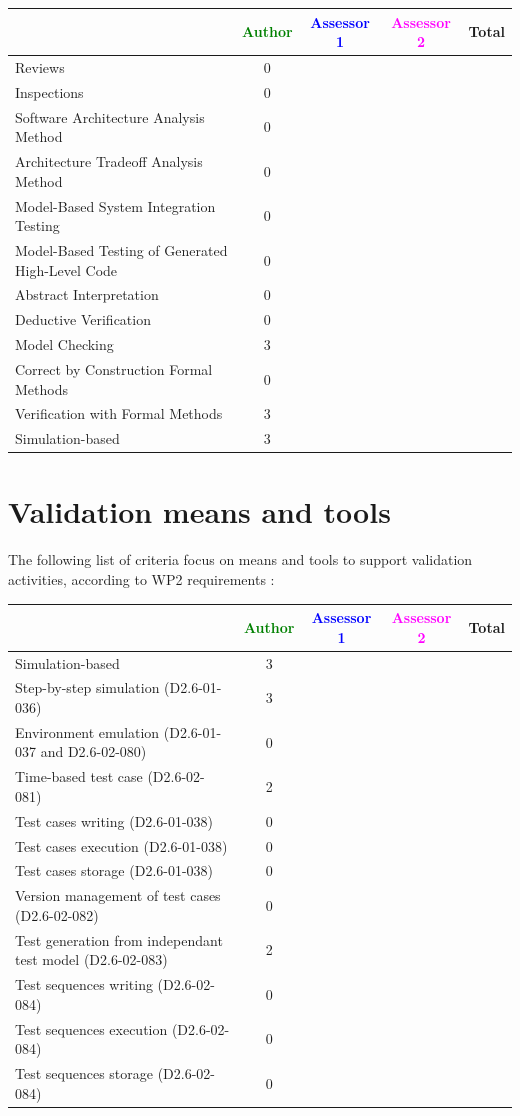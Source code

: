 \begin{tabular}{|l | c | c | c | c|}
\hline
& \textcolor{green}{Author} & \textcolor{blue}{Assessor 1} & \textcolor{magenta}{Assessor 2} & Total \\
\hline 
Reviews & 0& & &  \\
\hline
Inspections & 0& & &  \\
\hline
Software Architecture Analysis Method & 0& & &  \\
\hline
Architecture Tradeoff Analysis Method & 0& & &  \\
\hline
Model-Based System Integration Testing & 0& & &  \\
\hline
Model-Based Testing of Generated High-Level Code & 0& & &  \\
\hline
Abstract Interpretation & 0& & &  \\
\hline
Deductive Verification & 0& & &  \\
\hline
Model Checking & 3& & &  \\
\hline
Correct by Construction Formal Methods & 0& & &  \\
\hline
Verification with Formal Methods & 3& & &  \\
\hline
Simulation-based & 3& & &  \\
\hline
\end{tabular}

\section{Validation means and tools}

The following list of criteria focus on means and tools to support validation activities, according to WP2  requirements :

\begin{tabular}{|l | c | c | c | c|}
\hline
& \textcolor{green}{Author} & \textcolor{blue}{Assessor 1} & \textcolor{magenta}{Assessor 2} & Total \\
\hline 
Simulation-based & 3& & &  \\
\hline
Step-by-step simulation (D2.6-01-036) & 3& & &  \\
\hline
Environment emulation (D2.6-01-037 and D2.6-02-080) & 0& & &  \\
\hline
Time-based test case (D2.6-02-081) & 2& & &  \\
\hline
Test cases writing (D2.6-01-038) & 0& & &  \\
\hline
Test cases execution (D2.6-01-038) & 0& & &  \\
\hline
Test cases storage (D2.6-01-038) & 0& & &  \\
\hline
Version management of test cases (D2.6-02-082) & 0& & &  \\
\hline
Test generation from independant test model (D2.6-02-083) & 2& & &  \\
\hline
Test sequences writing (D2.6-02-084) & 0& & &  \\
\hline
Test sequences execution (D2.6-02-084) & 0& & &  \\
\hline
Test sequences storage (D2.6-02-084) & 0& & &  \\
\hline
\end{tabular}


